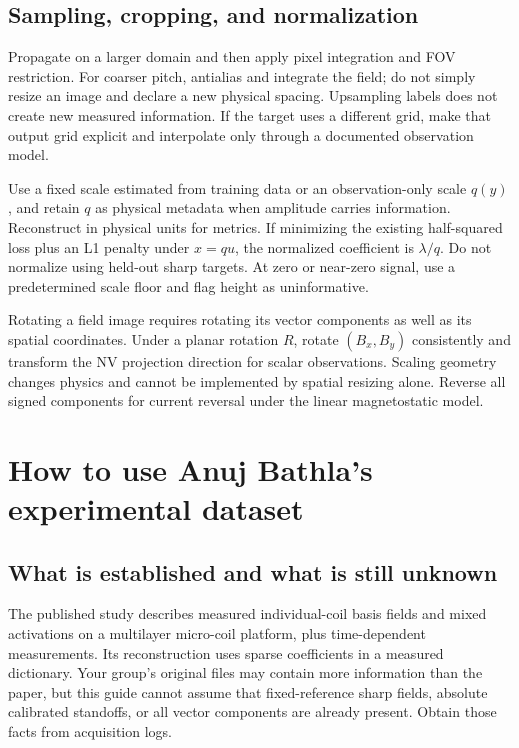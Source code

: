 \subsection{Sampling, cropping, and normalization}
Propagate on a larger domain and then apply pixel integration and FOV restriction. For coarser pitch, antialias and integrate the field; do not simply resize an image and declare a new physical spacing. Upsampling labels does not create new measured information. If the target uses a different grid, make that output grid explicit and interpolate only through a documented observation model.

Use a fixed scale estimated from training data or an observation-only scale $q(y)$, and retain $q$ as physical metadata when amplitude carries information. Reconstruct in physical units for metrics. If minimizing the existing half-squared loss plus an L1 penalty under $x=q u$, the normalized coefficient is $\lambda/q$. Do not normalize using held-out sharp targets. At zero or near-zero signal, use a predetermined scale floor and flag height as uninformative.

Rotating a field image requires rotating its vector components as well as its spatial coordinates. Under a planar rotation $R$, rotate $(B_x,B_y)$ consistently and transform the NV projection direction for scalar observations. Scaling geometry changes physics and cannot be implemented by spatial resizing alone. Reverse all signed components for current reversal under the linear magnetostatic model.

\section{How to use Anuj Bathla's experimental dataset}
\label{sec:bathla}
\subsection{What is established and what is still unknown}
The published study describes measured individual-coil basis fields and mixed activations on a multilayer micro-coil platform, plus time-dependent measurements. Its reconstruction uses sparse coefficients in a measured dictionary. Your group's original files may contain more information than the paper, but this guide cannot assume that fixed-reference sharp fields, absolute calibrated standoffs, or all vector components are already present. Obtain those facts from acquisition logs.


